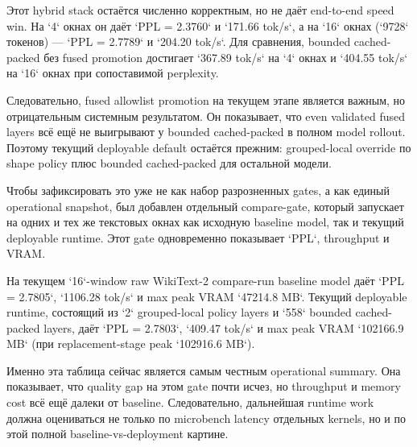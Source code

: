 Этот hybrid stack остаётся численно корректным, но не даёт end-to-end speed win.
На `4` окнах он даёт `PPL = 2.3760` и `171.66 tok/s`, а на `16` окнах
(`9728` токенов) — `PPL = 2.7789` и `204.20 tok/s`. Для сравнения, bounded
cached-packed без fused promotion достигает `367.89 tok/s` на `4` окнах и
`404.55 tok/s` на `16` окнах при сопоставимой perplexity.

Следовательно, fused allowlist promotion на текущем этапе является важным, но
отрицательным системным результатом. Он показывает, что even validated fused
layers всё ещё не выигрывают у bounded cached-packed в полном model rollout.
Поэтому текущий deployable default остаётся прежним: grouped-local override по
shape policy плюс bounded cached-packed для остальной модели.

Чтобы зафиксировать это уже не как набор разрозненных gates, а как единый
operational snapshot, был добавлен отдельный compare-gate, который запускает на
одних и тех же текстовых окнах как исходную baseline model, так и текущий
deployable runtime. Этот gate одновременно показывает `PPL`, throughput и VRAM.

На текущем `16`-window raw WikiText-2 compare-run baseline model даёт
`PPL = 2.7805`, `1106.28 tok/s` и max peak VRAM `47214.8 MB`. Текущий
deployable runtime, состоящий из `2` grouped-local policy layers и `558`
bounded cached-packed layers, даёт `PPL = 2.7803`, `409.47 tok/s` и max peak
VRAM `102166.9 MB` (при replacement-stage peak `102916.6 MB`).

Именно эта таблица сейчас является самым честным operational summary. Она
показывает, что quality gap на этом gate почти исчез, но throughput и memory
cost всё ещё далеки от baseline. Следовательно, дальнейшая runtime work должна
оцениваться не только по microbench latency отдельных kernels, но и по этой
полной baseline-vs-deployment картине.